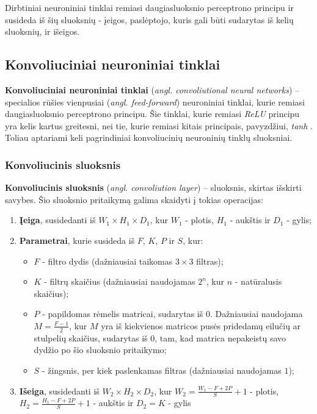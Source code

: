 \documentclass{VUMIFPSbakalaurinis}
\begin{document}
Dirbtiniai neuroniniai tinklai remiasi daugiasluoksnio perceptrono principu ir susideda iš šių sluoksnių - įeigos, paslėptojo, kuris gali būti sudarytas iš kelių sluoksnių, ir išeigos.






\subsection{Konvoliuciniai neuroniniai tinklai}

\textbf{Konvoliuciniai neuroniniai tinklai} (\textit{angl. convoliutional neural networks}) – specialios rūšies vienpusiai (\textit{angl. feed-forward}) neuroniniai tinklai, kurie remiasi daugiasluoksnio perceptrono principu. Šie tinklai, kurie remiasi \textit{ReLU} principu yra kelis kartus greitesni, nei tie, kurie remiasi kitais principais, pavyzdžiui, \textit{tanh} \cite{NIPS2012_4824}. Toliau aptariami keli pagrindiniai konvoliucinių neuroninių tinklų sluoksniai.

\subsubsection{Konvoliucinis sluoksnis}

\textbf{Konvoliucinis sluoksnis} (\textit{angl. convoliution layer}) – sluoksnis, skirtas išskirti savybes. Šio sluoksnio 
pritaikymą galima skaidyti į tokias operacijas:


\begin{enumerate}
	\item \textbf{Įeiga}, susidedanti iš $ W_1 \times H_1 \times D_1 $, kur $ W_1 $ - plotis, $ H_1 $ - aukštis ir $ D_1 $ - gylis;
	\item \textbf{Parametrai}, kurie susideda iš $ F $, $ K $, $ P $ ir $ S $, kur:
	\begin{itemize}
		\item $ F $ - filtro dydis (dažniausiai taikomas $ 3 \times 3 $ filtras);
		\item $ K $ - filtrų skaičius (dažniausiai naudojamas  $ 2^n $, kur $ n $ - natūralusis skaičius);
		\item $ P $ - papildomas rėmelis matricai, sudarytas iš 0. Dažniausiai naudojama $ M = \frac{F - 1}{2} $, kur $ M $ yra iš kiekvienos matricos pusės pridedamų eilučių ar stulpelių skaičius, sudarytas iš $0$, tam, kad matrica nepakeistų savo dydžio po šio sluoksnio pritaikymo; 
		\item $ S $ - žingsnis, per kiek paslenkamas filtras (dažniausiai naudojamas $ 1 $);
	\end{itemize}
	\item \textbf{Išeiga}, susidedanti iš $ W_2 \times H_2 \times D_2 $, kur $ W_2 = \frac{W_1 - F + 2P}{S} + 1 $ - plotis, $ H_2 = \frac{H_1 - F + 2P}{S} + 1 $ - aukštis ir $ D_2 = K $ - gylis
\end{enumerate}
\end{document}
